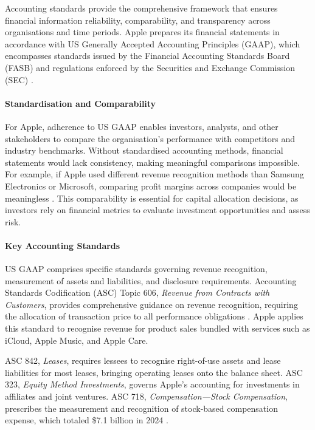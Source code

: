 \documentclass[12pt,a4paper]{article}
\begin{document}
Accounting standards provide the comprehensive framework that ensures financial information reliability, comparability, and transparency across organisations and time periods. Apple prepares its financial statements in accordance with US Generally Accepted Accounting Principles (GAAP), which encompasses standards issued by the Financial Accounting Standards Board (FASB) and regulations enforced by the Securities and Exchange Commission (SEC) \citep{fasb2024, sec2024}.

\paragraph{Standardisation and Comparability}

For Apple, adherence to US GAAP enables investors, analysts, and other stakeholders to compare the organisation's performance with competitors and industry benchmarks. Without standardised accounting methods, financial statements would lack consistency, making meaningful comparisons impossible. For example, if Apple used different revenue recognition methods than Samsung Electronics or Microsoft, comparing profit margins across companies would be meaningless \citep{kieso2023}. This comparability is essential for capital allocation decisions, as investors rely on financial metrics to evaluate investment opportunities and assess risk.

\paragraph{Key Accounting Standards}

US GAAP comprises specific standards governing revenue recognition, measurement of assets and liabilities, and disclosure requirements. Accounting Standards Codification (ASC) Topic 606, \textit{Revenue from Contracts with Customers}, provides comprehensive guidance on revenue recognition, requiring the allocation of transaction price to all performance obligations \citep{fasb2014}. Apple applies this standard to recognise revenue for product sales bundled with services such as iCloud, Apple Music, and Apple Care.

ASC 842, \textit{Leases}, requires lessees to recognise right-of-use assets and lease liabilities for most leases, bringing operating leases onto the balance sheet. ASC 323, \textit{Equity Method Investments}, governs Apple's accounting for investments in affiliates and joint ventures. ASC 718, \textit{Compensation---Stock Compensation}, prescribes the measurement and recognition of stock-based compensation expense, which totaled \$7.1 billion in 2024 \citep{apple202410k}.
\end{document}
